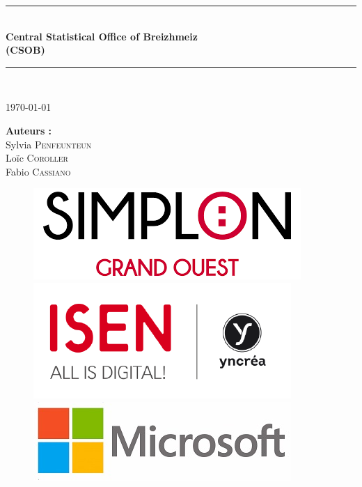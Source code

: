 \documentclass[french]{article}
\begin{document}
\begin{titlepage}

\newcommand{\HRule}{\rule{\linewidth}{0.5mm}} %

\center %
 
\HRule \\[0.4cm]
\vspace{1cm}
{ \huge \bfseries Central Statistical Office of Breizhmeiz \\
\vspace{0.5cm}
(CSOB)}\\ %
\vspace{1cm}
\HRule \\[1cm]
 
\vspace{1cm}

\Large \today

\vspace{3cm}

\begin{minipage}{0.4\textwidth}
\begin{center}
\Large \textbf{Auteurs :}\\
\vspace{0.5cm}
Sylvia \textsc{Penfeunteun} \\
Loïc \textsc{Coroller}\\
Fabio \textsc{Cassiano}
\end{center}
\end{minipage}

\vspace{5cm}

\begin{figure}[!ht]
	\includegraphics[height=0.1\columnwidth]{Image/logo/logo_simplon.png}
	\hspace*{0.5cm}
	\includegraphics[height=0.12\columnwidth]{Image/logo/logo_Isen.png}
	\hspace*{0.5cm}
	\includegraphics[height=0.1\columnwidth]{Image/logo/logo_microsoft.jpg}
\end{figure}


\end{titlepage}
\end{document}
